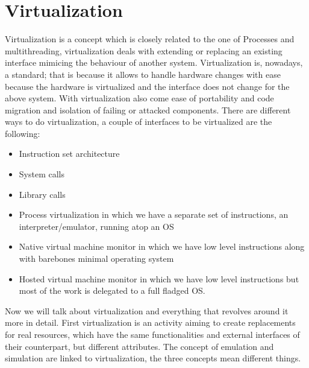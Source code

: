 \section{Virtualization}
Virtualization is a concept which is closely related to the one of Processes and multithreading, virtualization deals with extending or replacing an existing interface mimicing the behaviour of another system. \n
Virtualization is, nowadays, a standard; that is because it allows to handle hardware changes with ease because the hardware is virtualized and the interface does not change for the above system. With virtualization also come ease of portability and code migration and isolation of failing or attacked components. \n
There are different ways to do virtualization, a couple of interfaces to be virtualized are the following:
\begin{itemize}
    \item Instruction set architecture
    \item System calls
    \item Library calls
    \item Process virtualization in which we have a separate set of instructions, an interpreter/emulator, running atop an OS
    \item Native virtual machine monitor in which we have low level instructions along with barebones minimal operating system
    \item Hosted virtual machine monitor in which we have low level instructions but most of the work is delegated to a full fladged OS.
\end{itemize}
Now we will talk about virtualization and everything that revolves around it more in detail. \n
First virtualization is an activity aiming to create replacements for real resources, which have the same functionalities and external interfaces of their counterpart, but different attributes. \n
The concept of emulation and simulation are linked to virtualization, the three concepts mean different things. \n
